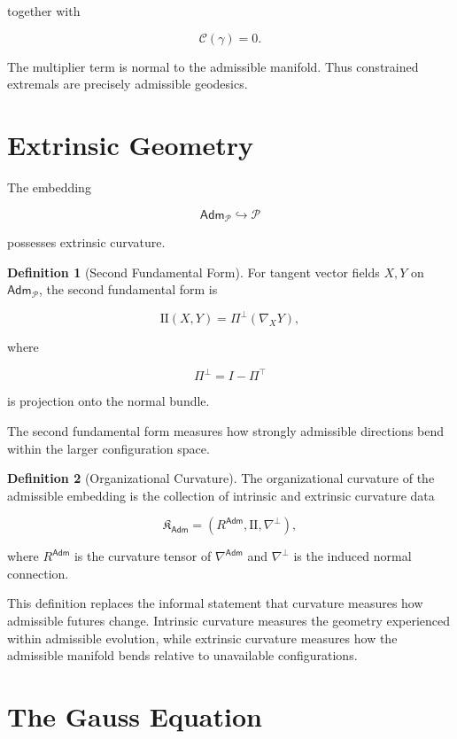 \documentclass[11pt,oneside]{book}
\numberwithin{equation}{chapter}
\theoremstyle{definition}
\newtheorem{definition}{Definition}[chapter]
\theoremstyle{plain}
\newcommand{\Adm}{\mathsf{Adm}}
\begin{document}
together with

\[
\mathcal C(\gamma)=0.
\]

The multiplier term is normal to the admissible manifold. Thus constrained
extremals are precisely admissible geodesics.

\section{Extrinsic Geometry}

The embedding

\[
\Adm_{\mathcal P}
\hookrightarrow
\mathcal P
\]

possesses extrinsic curvature.

\begin{definition}[Second Fundamental Form]

For tangent vector fields \(X,Y\) on \(\Adm_{\mathcal P}\), the second
fundamental form is

\[
\mathrm{II}(X,Y)
=
\Pi^{\perp}
\left(
\nabla_XY
\right),
\]

where

\[
\Pi^{\perp}
=
I-\Pi^{\top}
\]

is projection onto the normal bundle.

\end{definition}

The second fundamental form measures how strongly admissible directions
bend within the larger configuration space.

\begin{definition}[Organizational Curvature]

The organizational curvature of the admissible embedding is the collection
of intrinsic and extrinsic curvature data

\[
\mathfrak K_{\Adm}
=
\left(
R^{\Adm},
\mathrm{II},
\nabla^{\perp}
\right),
\]

where \(R^{\Adm}\) is the curvature tensor of
\(\nabla^{\Adm}\) and \(\nabla^{\perp}\) is the induced normal connection.

\end{definition}

This definition replaces the informal statement that curvature measures how
admissible futures change. Intrinsic curvature measures the geometry
experienced within admissible evolution, while extrinsic curvature measures
how the admissible manifold bends relative to unavailable configurations.

\section{The Gauss Equation}
\end{document}
